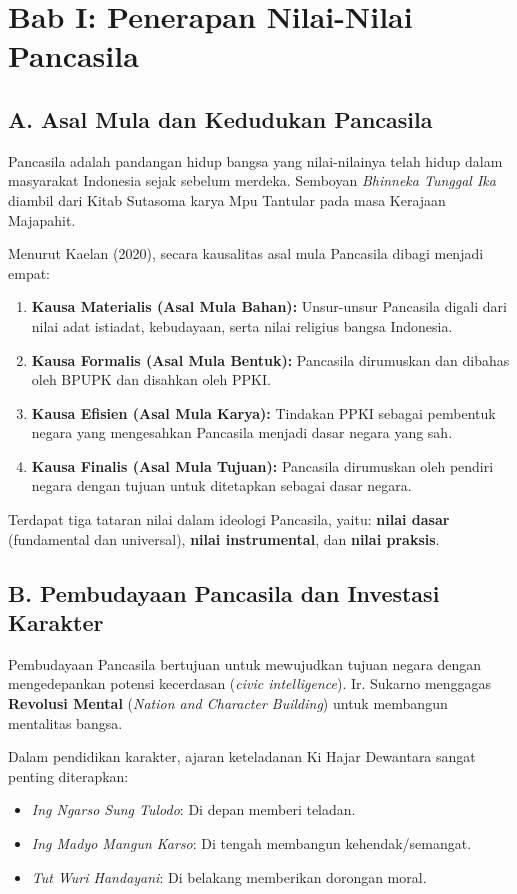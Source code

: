 \section{Bab I: Penerapan Nilai-Nilai Pancasila}
\subsection{A. Asal Mula dan Kedudukan Pancasila}
Pancasila adalah pandangan hidup bangsa yang nilai-nilainya telah hidup dalam masyarakat Indonesia sejak sebelum merdeka. Semboyan \textit{Bhinneka Tunggal Ika} diambil dari Kitab Sutasoma karya Mpu Tantular pada masa Kerajaan Majapahit.

Menurut Kaelan (2020), secara kausalitas asal mula Pancasila dibagi menjadi empat:
\begin{enumerate}
    \item \textbf{Kausa Materialis (Asal Mula Bahan):} Unsur-unsur Pancasila digali dari nilai adat istiadat, kebudayaan, serta nilai religius bangsa Indonesia.
    \item \textbf{Kausa Formalis (Asal Mula Bentuk):} Pancasila dirumuskan dan dibahas oleh BPUPK dan disahkan oleh PPKI.
    \item \textbf{Kausa Efisien (Asal Mula Karya):} Tindakan PPKI sebagai pembentuk negara yang mengesahkan Pancasila menjadi dasar negara yang sah.
    \item \textbf{Kausa Finalis (Asal Mula Tujuan):} Pancasila dirumuskan oleh pendiri negara dengan tujuan untuk ditetapkan sebagai dasar negara.
\end{enumerate}

Terdapat tiga tataran nilai dalam ideologi Pancasila, yaitu: \textbf{nilai dasar} (fundamental dan universal), \textbf{nilai instrumental}, dan \textbf{nilai praksis}.

\subsection{B. Pembudayaan Pancasila dan Investasi Karakter}
Pembudayaan Pancasila bertujuan untuk mewujudkan tujuan negara dengan mengedepankan potensi kecerdasan (\textit{civic intelligence}). Ir. Sukarno menggagas \textbf{Revolusi Mental} (\textit{Nation and Character Building}) untuk membangun mentalitas bangsa. 

Dalam pendidikan karakter, ajaran keteladanan Ki Hajar Dewantara sangat penting diterapkan:
\begin{itemize}
    \item \textit{Ing Ngarso Sung Tulodo}: Di depan memberi teladan.
    \item \textit{Ing Madyo Mangun Karso}: Di tengah membangun kehendak/semangat.
    \item \textit{Tut Wuri Handayani}: Di belakang memberikan dorongan moral.
\end{itemize}

